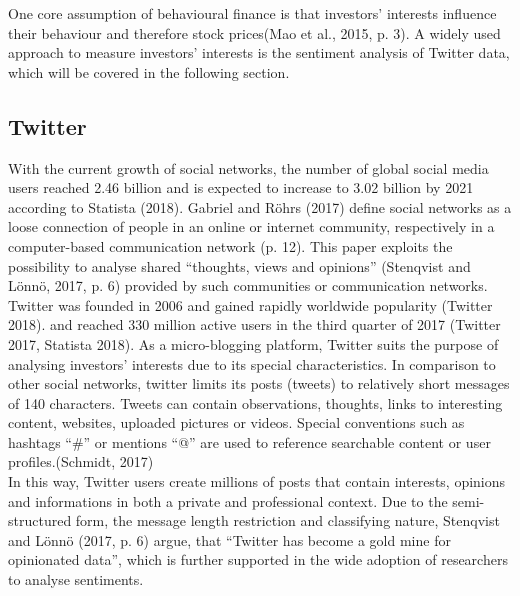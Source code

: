 \documentclass[a4paper,american,12pt]{article}
\begin{document}
\begin{spacing}{1.2}
One core assumption of behavioural finance is that investors’ interests influence their behaviour and therefore stock prices(Mao et al., 2015, p. 3). A widely used approach to measure investors’ interests is the sentiment analysis of Twitter data, which will be covered in the following section.\\
		
\subsection{Twitter}
With the current growth of social networks, the number of global social media users reached 2.46 billion and is expected to increase to 3.02 billion by 2021 according to Statista (2018). Gabriel and Röhrs (2017) define social networks as a loose connection of people in an online or internet community, respectively in a computer-based communication network (p. 12). This paper exploits the possibility to analyse shared “thoughts, views and opinions” (Stenqvist and Lönnö, 2017, p. 6) provided by such communities or communication networks.\\

Twitter was founded in 2006 and gained rapidly worldwide popularity (Twitter 2018). and reached 330 million active users in the third quarter of 2017 (Twitter 2017, Statista 2018). As a micro-blogging platform, Twitter suits the purpose of analysing investors’ interests due to its special characteristics. In comparison to other social networks, twitter limits its posts (tweets) to relatively short messages of 140 characters. Tweets can contain observations, thoughts, links to interesting content, websites, uploaded pictures or videos. Special conventions such as hashtags “\#” or mentions “@” are used to reference searchable content or user profiles.(Schmidt, 2017)\\

In this way, Twitter users create millions of posts that contain interests, opinions and informations in both a private and professional context.  Due to the semi-structured form, the message length restriction and classifying nature, Stenqvist and Lönnö (2017, p. 6) argue, that “Twitter has become a gold mine for opinionated data”, which is further supported in the wide adoption of researchers to analyse sentiments.\\


\end{spacing}
\end{document}
